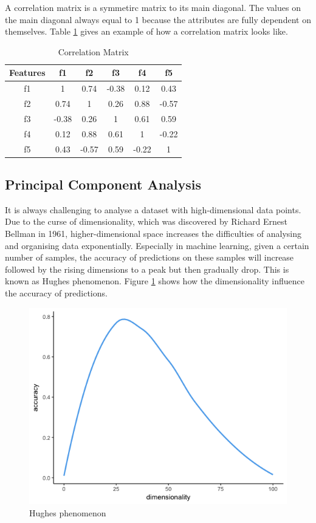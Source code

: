 \documentclass[11pt]{article} %
\theoremstyle{plain}
\theoremstyle{definition}
\begin{document}
A correlation matrix is a symmetirc matrix to its main diagonal. The values on the main diagonal always equal to 1 because the attributes are fully dependent on themselves. Table \ref{table:cormat} gives an example of how a correlation matrix looks like.

{
  \begin{table}[ht]
    \centering
    \begin{tabular}{|c|c c c c c|}
      \hline
      Features & f1 & f2 & f3 & f4 & f5 \\ [0.5ex]
      \hline
      f1 & 1 & 0.74 & -0.38 & 0.12 & 0.43 \\ 
      \hline
      f2 & 0.74 & 1 & 0.26 & 0.88 & -0.57 \\
      \hline
      f3 & -0.38 & 0.26 & 1 & 0.61 & 0.59 \\
      \hline
      f4 & 0.12 & 0.88 & 0.61 & 1 & -0.22 \\
      \hline
      f5 & 0.43 & -0.57 & 0.59 & -0.22 & 1 \\ 
      \hline
    \end{tabular}
    \caption{Correlation Matrix}
    \label{table:cormat}
  \end{table}
}

\subsection{Principal Component Analysis}

It is always challenging to analyse a dataset with high-dimensional data points. Due to the curse of dimensionality, which was discovered by Richard Ernest Bellman in 1961, higher-dimensional space increases the difficulties of analysing and organising data exponentially\cite{wiki/cod:2018}. Especially in machine learning, given a certain number of samples, the accuracy of predictions on these samples will increase followed by the rising dimensions to a peak but then gradually drop. This is known as Hughes phenomenon\cite{hughes/itoit:1968}. Figure \ref{fig:hughes} shows how the dimensionality influence the accuracy of predictions.

\begin{figure}[ht]
  \includegraphics[width=0.8\linewidth, center]{resources/dimensionality.png}
  \caption{Hughes phenomenon}
  \label{fig:hughes}
\end{figure}
\end{document}
